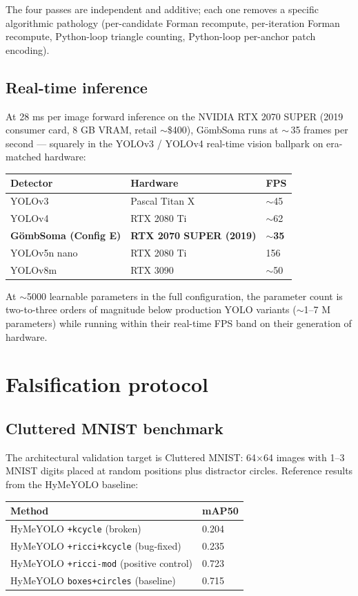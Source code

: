 \documentclass[11pt,a4paper]{article}
\newcommand{\GS}{G\"ombSoma}
\begin{document}
The four passes are independent and additive; each one removes a
specific algorithmic pathology (per-candidate Forman recompute,
per-iteration Forman recompute, Python-loop triangle counting,
Python-loop per-anchor patch encoding).

\subsection{Real-time inference}

At 28 ms per image forward inference on the NVIDIA RTX 2070 SUPER
(2019 consumer card, 8 GB VRAM, retail $\sim$\$400), \GS{} runs at
$\sim$\,35 frames per second — squarely in the YOLOv3 / YOLOv4
real-time vision ballpark on era-matched hardware:

\begin{center}
\begin{tabular}{lll}
\toprule
Detector & Hardware & FPS \\
\midrule
YOLOv3 & Pascal Titan X & $\sim$45 \\
YOLOv4 & RTX 2080 Ti & $\sim$62 \\
\textbf{\GS{} (Config E)} & \textbf{RTX 2070 SUPER (2019)} & \textbf{$\sim$35} \\
YOLOv5n nano & RTX 2080 Ti & 156 \\
YOLOv8m & RTX 3090 & $\sim$50 \\
\bottomrule
\end{tabular}
\end{center}

At $\sim$5000 learnable parameters in the full configuration, the
parameter count is two-to-three orders of magnitude below
production YOLO variants ($\sim$1--7 M parameters) while running
within their real-time FPS band on their generation of hardware.

\section{Falsification protocol}

\subsection{Cluttered MNIST benchmark}

The architectural validation target is Cluttered MNIST: 64$\times$64
images with 1--3 MNIST digits placed at random positions plus
distractor circles. Reference results from the HyMeYOLO baseline:

\begin{center}
\begin{tabular}{ll}
\toprule
Method & mAP50 \\
\midrule
HyMeYOLO \texttt{+kcycle} (broken) & 0.204 \\
HyMeYOLO \texttt{+ricci+kcycle} (bug-fixed) & 0.235 \\
HyMeYOLO \texttt{+ricci-mod} (positive control) & 0.723 \\
HyMeYOLO \texttt{boxes+circles} (baseline) & 0.715 \\
\bottomrule
\end{tabular}
\end{center}
\end{document}

